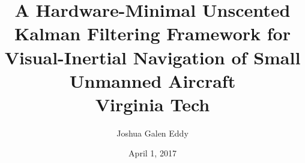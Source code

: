 \documentclass[11 pt]{report}
\begin{document}
\title{
	{A Hardware-Minimal Unscented Kalman Filtering Framework for Visual-Inertial Navigation of Small Unmanned Aircraft}\\
	\vspace{1 em}
	{\Large Virginia Tech}
}
\author{Joshua Galen Eddy}
\date{April 1, 2017}

\maketitle


%

\begin{comment}
\tableofcontents
\listoffigures
\listoftables
\end{comment}

%



%

\begin{comment}
    \chapter{Experimental Design}
    \chapter{Experimental Results}
    \chapter{Conclusions}
    \chapter{Future Work}
    \appendix
\end{comment}

\clearpage
{}


\end{document}
